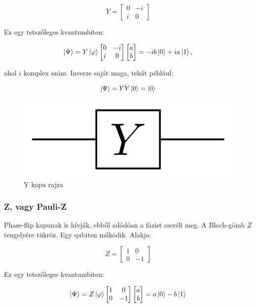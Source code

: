 \documentclass[
]{thesis-ekf}
\theoremstyle{definition}
\theoremstyle{remark}
\begin{document}
\begin{equation}
	Y= 
	\begin{bmatrix}
		0 & -i\\
		i & 0
	\end{bmatrix}
\end{equation}

Ez egy tetszőleges kvantumbiten:

\begin{equation}
	\ket{\Psi}=Y\ket{\varphi}
		\begin{bmatrix}
			0 & -i\\
			i & 0
		\end{bmatrix}
		\begin{bmatrix}
			a\\
			b
		\end{bmatrix}=-ib\ket{0}+ia\ket{1},
\end{equation}

ahol $i$ komplex szám. Inverze saját maga, tehát például:

\begin{equation}
	\ket{\Psi}=YY\ket{0}=\ket{0}
\end{equation}

\begin{figure}[H]
	\centering
	\includegraphics[width=0.3\linewidth]{Pauli_Y}
	\caption{Y kapu rajza}
	\label{fig:pauliy}
\end{figure}


\subsubsection{Z, vagy Pauli-Z}
Phase-flip kapunak is hívják, ebből adódóan a fázist cseréli meg. A Bloch-gömb $Z$ tengelyére tükröz. Egy qubiten működik. Alakja:

\begin{equation}
	Z= 
	\begin{bmatrix}
		1 & 0\\
		0 & -1
	\end{bmatrix}
\end{equation}

Ez egy tetszőleges kvantumbiten:

\begin{equation}
	\ket{\Psi}=Z\ket{\varphi}
		\begin{bmatrix}
			1 & 0\\
			0 & -1
		\end{bmatrix}
		\begin{bmatrix}
			a\\
			b
		\end{bmatrix}=a\ket{0}-b\ket{1}
\end{equation}
\end{document}
